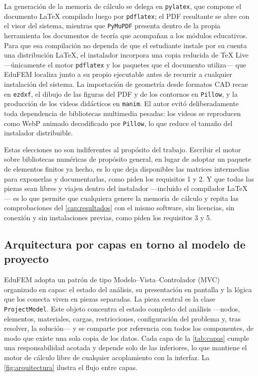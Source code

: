 La generación de la memoria de cálculo se delega en \texttt{pylatex}, que compone el documento \LaTeX{} compilado luego por \texttt{pdflatex}; el PDF resultante se abre con el visor del sistema, mientras que \texttt{PyMuPDF} presenta dentro de la propia herramienta los documentos de teoría que acompañan a los módulos educativos. Para que esa compilación no dependa de que el estudiante instale por su cuenta una distribución \LaTeX{}, el instalador incorpora una copia reducida de \TeX{} Live —únicamente el motor \texttt{pdflatex} y los paquetes que el documento utiliza— que EduFEM localiza junto a su propio ejecutable antes de recurrir a cualquier instalación del sistema. La importación de geometría desde formatos CAD recae en \texttt{ezdxf}, el dibujo de las figuras del PDF y de los contornos en \texttt{Pillow}, y la producción de los videos didácticos en \texttt{manim}. El autor evitó deliberadamente toda dependencia de bibliotecas multimedia pesadas: los videos se reproducen como WebP animado decodificado por \texttt{Pillow}, lo que reduce el tamaño del instalador distribuible.

Estas elecciones no son indiferentes al propósito del trabajo. Escribir el motor sobre bibliotecas numéricas de propósito general, en lugar de adoptar un paquete de elementos finitos ya hecho, es lo que deja disponibles las matrices intermedias para exponerlas y documentarlas, como piden los requisitos 1 y 2. Y que todas las piezas sean libres y viajen dentro del instalador —incluido el compilador \LaTeX{}— es lo que permite que cualquiera genere la memoria de cálculo y repita las comprobaciones del \autoref{cap:resultados} con el mismo software, sin licencias, sin conexión y sin instalaciones previas, como piden los requisitos 3 y 5.

\subsection{Arquitectura por capas en torno al modelo de proyecto}
\label{sec:arquitectura}

EduFEM adopta un patrón de tipo Modelo--Vista--Controlador (MVC) organizado en capas: el estado del análisis, su presentación en pantalla y la lógica que los conecta viven en piezas separadas. La pieza central es la clase \texttt{ProjectModel}. Este objeto concentra el estado completo del análisis —nodos, elementos, materiales, cargas, restricciones, configuración del problema y, tras resolver, la solución— y se comparte por referencia con todos los componentes, de modo que existe una sola copia de los datos. Cada capa de la \autoref{tab:capas} cumple una responsabilidad acotada y depende solo de las inferiores, lo que mantiene el motor de cálculo libre de cualquier acoplamiento con la interfaz. La \autoref{fig:arquitectura} ilustra el flujo entre capas.


